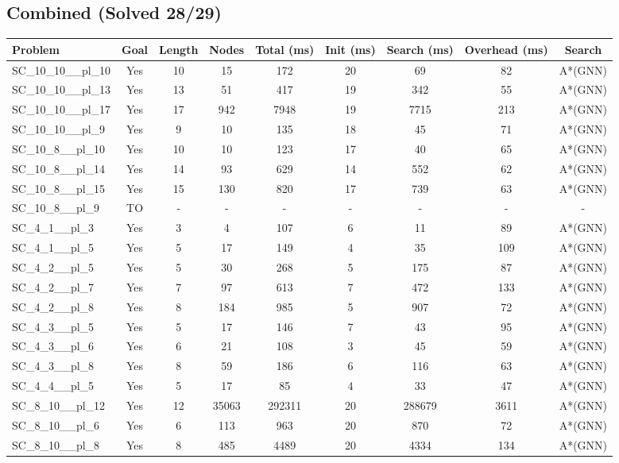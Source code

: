 \documentclass{article}
\begin{document}
\subsection*{Combined (Solved 28/29)}
\begin{tabular}{lcccccccc}
\toprule
Problem & Goal & Length & Nodes & Total (ms) & Init (ms) & Search (ms) & Overhead (ms) & Search \\
\midrule
SC\_10\_10\_\_pl\_10 & Yes & 10 & 15 & 172 & 20 & 69 & 82 & A*(GNN) \\
SC\_10\_10\_\_pl\_13 & Yes & 13 & 51 & 417 & 19 & 342 & 55 & A*(GNN) \\
SC\_10\_10\_\_pl\_17 & Yes & 17 & 942 & 7948 & 19 & 7715 & 213 & A*(GNN) \\
SC\_10\_10\_\_pl\_9 & Yes & 9 & 10 & 135 & 18 & 45 & 71 & A*(GNN) \\
SC\_10\_8\_\_pl\_10 & Yes & 10 & 10 & 123 & 17 & 40 & 65 & A*(GNN) \\
SC\_10\_8\_\_pl\_14 & Yes & 14 & 93 & 629 & 14 & 552 & 62 & A*(GNN) \\
SC\_10\_8\_\_pl\_15 & Yes & 15 & 130 & 820 & 17 & 739 & 63 & A*(GNN) \\
SC\_10\_8\_\_pl\_9 & TO & - & - & - & - & - & - & - \\
SC\_4\_1\_\_pl\_3 & Yes & 3 & 4 & 107 & 6 & 11 & 89 & A*(GNN) \\
SC\_4\_1\_\_pl\_5 & Yes & 5 & 17 & 149 & 4 & 35 & 109 & A*(GNN) \\
SC\_4\_2\_\_pl\_5 & Yes & 5 & 30 & 268 & 5 & 175 & 87 & A*(GNN) \\
SC\_4\_2\_\_pl\_7 & Yes & 7 & 97 & 613 & 7 & 472 & 133 & A*(GNN) \\
SC\_4\_2\_\_pl\_8 & Yes & 8 & 184 & 985 & 5 & 907 & 72 & A*(GNN) \\
SC\_4\_3\_\_pl\_5 & Yes & 5 & 17 & 146 & 7 & 43 & 95 & A*(GNN) \\
SC\_4\_3\_\_pl\_6 & Yes & 6 & 21 & 108 & 3 & 45 & 59 & A*(GNN) \\
SC\_4\_3\_\_pl\_8 & Yes & 8 & 59 & 186 & 6 & 116 & 63 & A*(GNN) \\
SC\_4\_4\_\_pl\_5 & Yes & 5 & 17 & 85 & 4 & 33 & 47 & A*(GNN) \\
SC\_8\_10\_\_pl\_12 & Yes & 12 & 35063 & 292311 & 20 & 288679 & 3611 & A*(GNN) \\
SC\_8\_10\_\_pl\_6 & Yes & 6 & 113 & 963 & 20 & 870 & 72 & A*(GNN) \\
SC\_8\_10\_\_pl\_8 & Yes & 8 & 485 & 4489 & 20 & 4334 & 134 & A*(GNN) \\

\end{tabular}
\end{document}
